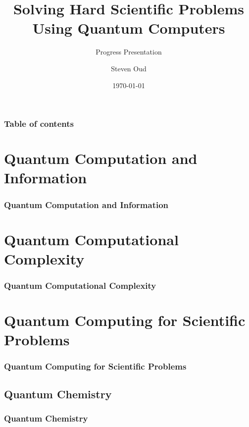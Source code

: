 \documentclass[pdf]{beamer}
\author{Steven Oud}
\title{{\LARGE Solving Hard Scientific Problems Using Quantum Computers}}
\subtitle{Progress Presentation}
\institute{Hogeschool van Amsterdam}
\date{\today}
\begin{document}
    \frame{\titlepage}
    
    \begin{frame}
    	\frametitle{Table of contents}
        \tableofcontents
    \end{frame}

    \section{Quantum Computation and Information}
    \begin{frame}
        \frametitle{Quantum Computation and Information}
    \end{frame}

    \section{Quantum Computational Complexity}
    \begin{frame}
        \frametitle{Quantum Computational Complexity}
    \end{frame}

    \section{Quantum Computing for Scientific Problems}
    \begin{frame}
        \frametitle{Quantum Computing for Scientific Problems}
    \end{frame}

    \subsection{Quantum Chemistry}
    \begin{frame}
        \frametitle{Quantum Chemistry}
    \end{frame}
\end{document}
